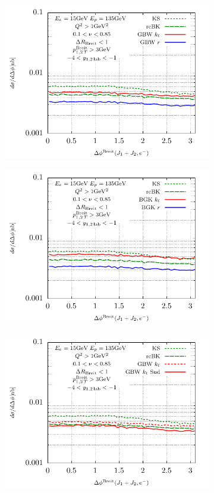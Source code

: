 \documentclass[11pt]{article}
\begin{document}
\begin{figure}[p]
	\begin{subfigure}{0.5\textwidth}
	\includegraphics[width=\textwidth]{plots/plotGBW1} 
	\end{subfigure}
	\begin{subfigure}{0.5\textwidth}
	\includegraphics[width=\textwidth]{plots/plotBGK1} 
	\end{subfigure}
	\begin{subfigure}{0.5\textwidth}
	\includegraphics[width=\textwidth]{plots/plotGBW2}

\end{subfigure}
\end{figure}
\end{document}
